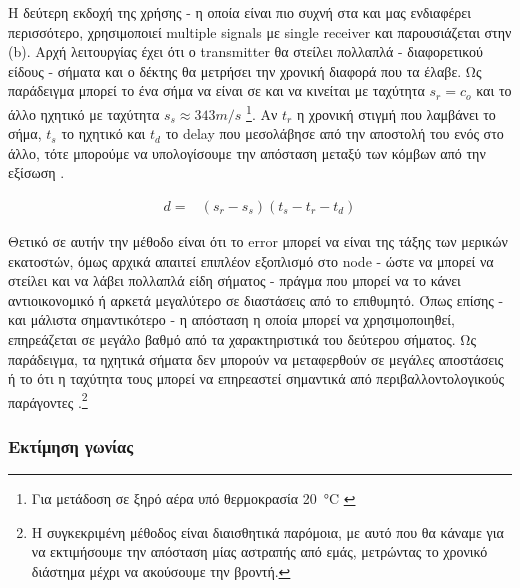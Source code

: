 Η δεύτερη εκδοχή της χρήσης  - η οποία είναι πιο συχνή στα  και 
μας ε\-νδια\-φέ\-ρει περισσότερο, 
χρησιμοποιεί multiple signals με single receiver και παρουσιάζεται στην  (b). 
Αρχή λειτουργίας έχει ότι ο transmitter θα στείλει πολλαπλά - διαφορετικού είδους - σήματα και ο δέκτης θα μετρήσει την χρονική διαφορά 
που τα έλαβε. Ως παράδειγμα μπορεί το ένα σήμα να είναι σε  και να κινείται με ταχύτητα $s_r=c_o$ και το άλλο 
ηχητικό με ταχύτητα $s_s \approx 343m/s$ \footnote{Για μετάδοση σε ξηρό αέρα υπό θερμοκρασία \SI{20}{\celsius} \cite{wikipedia-speed-of-sound}}. 
Αν $t_r$ η χρονική στιγμή που λαμβάνει το  σήμα, $t_s$ το ηχητικό και $t_d$ το delay που μεσολάβησε από την αποστολή του ενός στο άλλο,
τότε μπορούμε να υπολογίσουμε την απόσταση μεταξύ των κόμβων από την εξίσωση 
\cite{wsn-Localization-systems} \cite{localization-algorithms}.

\begin{align}
	d=&(s_r-s_s)(t_s-t_r-t_{d}) \label{eq:tdoa-distance}
\end{align}

Θετικό σε αυτήν την μέθοδο είναι ότι το error μπορεί να είναι της τάξης των μερικών εκατοστών, όμως αρχικά απαιτεί επιπλέον εξοπλισμό στο node -
ώστε να μπορεί να στείλει και να λάβει πολλαπλά είδη σήματος - πράγμα που μπορεί να το κάνει αντι\-οι\-κο\-νο\-μι\-κό ή αρκετά μεγαλύτερο σε διαστάσεις από 
το επιθυμητό. Όπως επίσης - και μάλιστα  
σημαντικότερο - η απόσταση η οποία μπορεί να 
χρησιμοποιηθεί, επηρεάζεται σε μεγάλο βαθμό από τα χαρακτηριστικά του δεύτερου σήματος. Ως παράδειγμα, τα ηχητικά σήματα 
δεν μπορούν να μεταφερθούν σε μεγάλες αποστάσεις ή το ότι η ταχύτητα τους μπορεί να επηρεαστεί σημαντικά από περιβαλλοντολογικούς παράγοντες
\cite{farooqiazam2016location}.\footnote{Η συγκεκριμένη μέθοδος είναι διαισθητικά παρόμοια, με αυτό που θα κάναμε για να εκτιμήσουμε 
την απόσταση μίας αστραπής από εμάς, μετρώντας το χρονικό διάστημα μέχρι να ακούσουμε την βροντή.} 

\subsubsection{Εκτίμηση γωνίας}\label{sec:Chapter3-1-2} %

